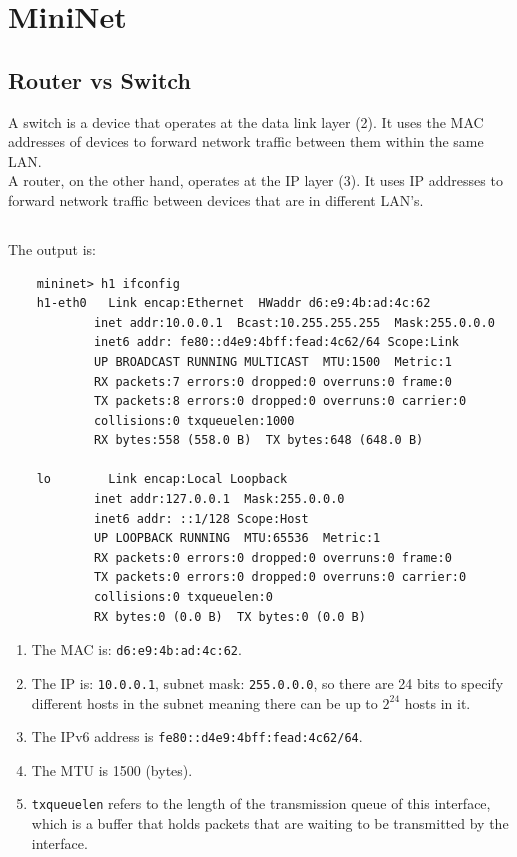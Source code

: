\section{MiniNet}
\subsection{Router vs Switch}
A switch is a device that operates at the data link layer (2). 
It uses the MAC addresses of devices to forward network traffic between them
within the same LAN.\\
A router, on the other hand, operates at the IP layer (3).
It uses IP addresses to forward network traffic between devices that are in
different LAN's.
\subsection{}
The output is:\\
\begin{verbatim}
    mininet> h1 ifconfig
    h1-eth0   Link encap:Ethernet  HWaddr d6:e9:4b:ad:4c:62  
            inet addr:10.0.0.1  Bcast:10.255.255.255  Mask:255.0.0.0
            inet6 addr: fe80::d4e9:4bff:fead:4c62/64 Scope:Link
            UP BROADCAST RUNNING MULTICAST  MTU:1500  Metric:1
            RX packets:7 errors:0 dropped:0 overruns:0 frame:0
            TX packets:8 errors:0 dropped:0 overruns:0 carrier:0
            collisions:0 txqueuelen:1000 
            RX bytes:558 (558.0 B)  TX bytes:648 (648.0 B)

    lo        Link encap:Local Loopback  
            inet addr:127.0.0.1  Mask:255.0.0.0
            inet6 addr: ::1/128 Scope:Host
            UP LOOPBACK RUNNING  MTU:65536  Metric:1
            RX packets:0 errors:0 dropped:0 overruns:0 frame:0
            TX packets:0 errors:0 dropped:0 overruns:0 carrier:0
            collisions:0 txqueuelen:0 
            RX bytes:0 (0.0 B)  TX bytes:0 (0.0 B)
\end{verbatim}
\begin{enumerate}
    \item The MAC is: \texttt{d6:e9:4b:ad:4c:62}.
    \item The IP is: \texttt{10.0.0.1}, subnet mask: \texttt{255.0.0.0},
    so there are 24 bits to specify different hosts in the subnet meaning there can be up to $2^{24}$ hosts in it.
    \item The IPv6 address is \texttt{fe80::d4e9:4bff:fead:4c62/64}.
    \item The MTU is 1500 (bytes).
    \item \texttt{txqueuelen} refers to the length of the transmission queue of this interface,
    which is a buffer that holds packets that are waiting to be transmitted by the interface.
\end{enumerate}
